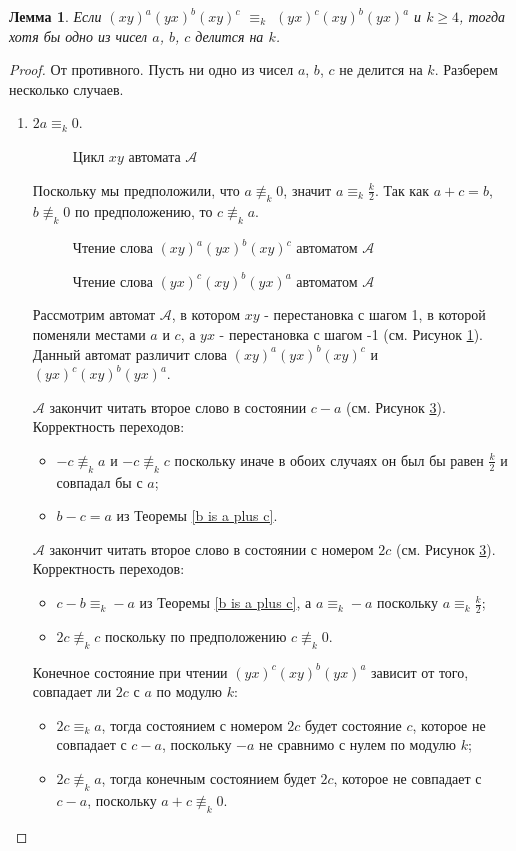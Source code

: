 \documentclass[12pt]{article}
\newtheorem{lemma}{Лемма}
\newcommand{\scalingimage}[3]{
	\begin{figure}
		\center{
			\texttt{[image: \#1]}
		}
		\caption{#3}
		\label{fig:#1}
	\end{figure}
}
\begin{document}
	\begin{lemma}
		Если $(xy)^a(yx)^b(xy)^c$ $\equiv_k$ $(yx)^c(xy)^b(yx)^a$ и $k \ge 4$, тогда хотя бы одно из чисел $a$, $b$, $c$ делится на $k$.
	\end{lemma}
	\begin{proof}
		От противного. Пусть ни одно из чисел $a$, $b$, $c$ не делится на $k$. Разберем несколько случаев.
		\begin{enumerate}
			\item $2a \equiv_k 0$.
			\scalingimage{cycle_a_c}{0.5}{Цикл $xy$ автомата $\mathscr{A}$}
			
			Поскольку мы предположили, что $a \not \equiv_k 0$, значит $a \equiv_k \frac{k}{2}$. Так как $a+c=b$, $b \not \equiv_k 0$ по предположению, то $c \not \equiv_k a$.
			
			\scalingimage{process1_a_c}{0.5}{Чтение слова $(xy)^a(yx)^b(xy)^c$ автоматом $\mathscr{A}$}
			\scalingimage{process2_a_c}{0.5}{Чтение слова $(yx)^c(xy)^b(yx)^a$ автоматом $\mathscr{A}$}
			
			Рассмотрим автомат $\mathscr{A}$, в котором $xy$ - перестановка с шагом 1, в которой поменяли местами $a$ и $c$, а $yx$ - перестановка с шагом -1 (см. Рисунок \ref{fig:cycle_a_c}). Данный автомат различит слова $(xy)^a(yx)^b(xy)^c$ и $(yx)^c(xy)^b(yx)^a$. 
						
			$\mathscr{A}$ закончит читать второе слово в состоянии $c-a$ (см. Рисунок \ref{fig:process2_a_c}).
			Корректность переходов:
			\begin{itemize}
				\item $-c \not \equiv_k a$ и $-c \not \equiv_k c$ поскольку иначе в обоих случаях он был бы равен $\frac{k}{2}$ и совпадал бы с $a$;
				\item $b-c = a$ из Теоремы \ref{b is a plus c}.
			\end{itemize}
			
			$\mathscr{A}$ закончит читать второе слово в состоянии с номером $2c$ (см. Рисунок \ref{fig:process2_a_c}).
			Корректность переходов:
			\begin{itemize}
				\item $c-b \equiv_k -a$ из Теоремы \ref{b is a plus c}, а $a \equiv_k -a$ поскольку $a \equiv_k \frac{k}{2}$;
				\item $2c \not \equiv_k c$ поскольку по предположению $c \not \equiv_k 0$.
			\end{itemize}
			Конечное состояние при чтении $(yx)^c(xy)^b(yx)^a$ зависит от того, совпадает ли $2c$ с $a$ по модулю $k$:
			\begin{itemize}
				\item $2c \equiv_k a$, тогда состоянием с номером $2c$ будет состояние $c$, которое не совпадает с $c-a$, поскольку $-a$ не сравнимо с нулем по модулю $k$;
				\item $2c \not \equiv_k a$, тогда конечным состоянием будет $2c$, которое не совпадает с $c-a$, поскольку $a+c \not \equiv_k 0$.
			\end{itemize}
			

\end{enumerate}
\end{proof}
\end{document}
